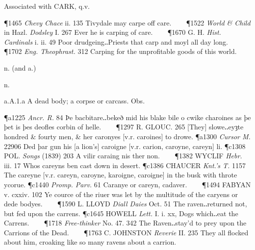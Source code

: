 \begin{description}[wide, labelwidth=!, labelindent=0pt]
\begin{myenumerate}
\vspace{0.1cm} \noindent
Associated with CARK, q.v.

\P 1465 \textit{Chevy  Chace} ii. 135 Tivydale may carpe off care.    
\P 1522 \textit{World  \& Child} in Hazl. \textit{Dodsley} I. 267 Ever he is carping of care.    
\P 1670 G. H.   \textit{Hist. Cardinals} i. ii. 49 Poor drudgeing‥Priests that carp and moyl all day long.    
\P 1702 \textit{Eng.  Theophrast.} 312 Carping for the unprofitable goods of this world.
\end{myenumerate}


 n. (and a.)

\noindent {}

\noindent [ME. caronye, caroine, a. ONF. \phonetic{caˈronië}, later caroine, caroigne, in central OF. charoigne (mod.F. charogne, and in other sense carogne, Picard carone, carongne) = Pr. caronha, It. carogna, Sp. carroña, pointing to a Romanic type *carōnia, supposed to be a deriv. of caro flesh, but not regularly formed on the stem carn-. The phonetic history of the English β. and δ. forms is obscure.]
\vspace{-0.3cm}

\begin{myenumerate}

 n.

 a.A.1.a A dead body; a corpse or carcass. Obs.

\P a1225 \textit{Ancr.  R.} 84 Þe bacbitare‥bekeð mid his blake bile o cwike charoines as þe þet is þes deofles corbin of helle.    
\P 1297 R. GLOUC.  265 [They] slowe‥eyȝte hondred \& fourty men, \& her caronyes [v.r. caroines] to drowe.
\P a1300  \textit{Cursor M.} 22906 Ded þar gun his [a lion's] caroigne [v.r. carion, caroyne, careyn] li.
\P c1308 POL.  \textit{Songs} (1839) 203 A vilir caraing nis ther non.    
\P 1382 WYCLIF  \textit{Hebr.} iii. 17 Whos careyns ben cast down in desert.
\P c1386 CHAUCER \textit{Knt.'s T.} 1157 The  careyne [v.r. careyn, caroyne, karoigne, caroigne] in the busk with throte ycorue. 
\P c1440  \textit{Promp. Parv.} 61 Caranye or careyn, cadaver.    
\P 1494 FABYAN v. cxxiv. 102 Ye cource of the riuer was let by the multitude of the caryens or dede bodyes.    
\P 1590 L. LLOYD  \textit{Diall Daies} Oct. 51 The raven‥returned not, but fed upon the carrens.
\P c1645 HOWELL  \textit{Lett.} I. i. xx, Dogs which‥eat the Carrens.    
\P 1718 \textit{Free-thinker}  No. 47. 342 The Raven‥stay'd to prey upon the Carrions of the Dead.    
\P 1763 C. JOHNSTON  \textit{Reverie} II. 235 They all flocked about him, croaking like so many ravens about a carrion.


\end{myenumerate}
\end{description}
